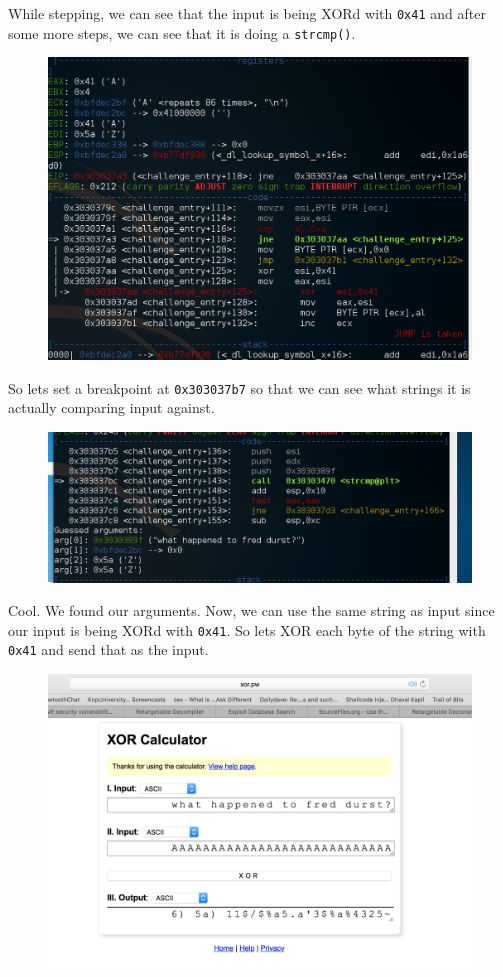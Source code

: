 \documentclass[12pt, bibliography=totocnumbered]{article}
\begin{document}
While stepping, we can see that the input is being XORd with \texttt{0x41} and after some more steps, we can see that it is doing a \texttt{strcmp()}. 
\begin{figure}[H]
\centerline{\includegraphics[width=1\textwidth]{img/2/1.png}}
\end{figure}
\newpage 
So lets set a breakpoint at \texttt{0x303037b7} so that we can see what strings it is actually comparing input against.
\begin{figure}[H]
\centerline{\includegraphics[width=1\textwidth]{img/2/2.png}}
\end{figure}
Cool. We found our arguments. Now, we can use the same string as input since our input is being XORd with \texttt{0x41}. So lets XOR each byte of the string with \texttt{0x41} and send that as the input.
\begin{figure}[H]
\centerline{\includegraphics[width=1\textwidth]{img/2/3.png}}
\end{figure}
\end{document}
